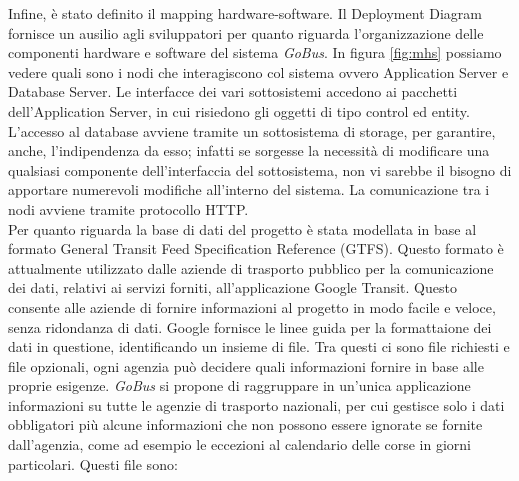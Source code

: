 Infine, \`{e} stato definito il mapping hardware-software. Il Deployment Diagram fornisce un ausilio agli sviluppatori per quanto riguarda l\rq organizzazione delle componenti hardware e software del sistema \emph{GoBus}. In figura \ref{fig:mhs} possiamo vedere quali sono i nodi che interagiscono col sistema ovvero Application Server e Database Server. Le interfacce dei vari sottosistemi accedono ai pacchetti dell\rq Application Server, in cui risiedono gli oggetti di tipo control ed entity. L\rq accesso al database avviene tramite un sottosistema di storage, per garantire, anche, l\rq indipendenza da esso; infatti se sorgesse la necessit\`{a} di modificare una qualsiasi componente dell\rq interfaccia del sottosistema, non vi sarebbe il bisogno di apportare numerevoli modifiche all\rq interno del sistema. La comunicazione tra i nodi avviene tramite protocollo HTTP.\\
Per quanto riguarda la base di dati del progetto \`{e} stata modellata in base al formato General Transit Feed Specification Reference (GTFS). Questo formato \`{e} attualmente utilizzato dalle aziende di trasporto pubblico per la comunicazione dei dati, 
relativi ai servizi forniti, all\rq applicazione Google Transit. Questo consente alle aziende di fornire informazioni al progetto in modo facile e veloce, senza ridondanza di dati. Google fornisce le linee guida per la formattaione dei dati in questione, identificando un insieme di file. Tra questi ci sono file richiesti e file opzionali, ogni agenzia pu\`{o} decidere quali informazioni fornire in base alle proprie esigenze. \emph{GoBus} si propone di raggruppare  in un\rq unica applicazione informazioni su tutte le agenzie di trasporto nazionali, per cui  gestisce solo i dati obbligatori pi\`{u} alcune informazioni che non possono essere ignorate se fornite dall\rq agenzia, come ad esempio le eccezioni al calendario delle corse in giorni particolari. Questi file sono:\\

